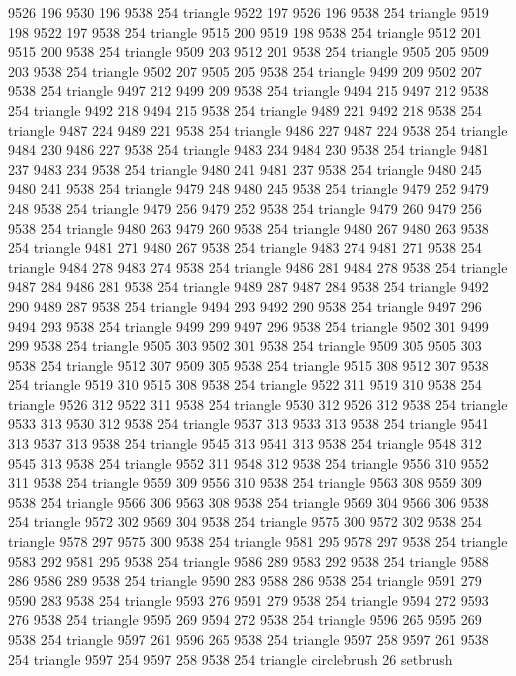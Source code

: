 9526 196 9530 196 9538 254 triangle
9522 197 9526 196 9538 254 triangle
9519 198 9522 197 9538 254 triangle
9515 200 9519 198 9538 254 triangle
9512 201 9515 200 9538 254 triangle
9509 203 9512 201 9538 254 triangle
9505 205 9509 203 9538 254 triangle
9502 207 9505 205 9538 254 triangle
9499 209 9502 207 9538 254 triangle
9497 212 9499 209 9538 254 triangle
9494 215 9497 212 9538 254 triangle
9492 218 9494 215 9538 254 triangle
9489 221 9492 218 9538 254 triangle
9487 224 9489 221 9538 254 triangle
9486 227 9487 224 9538 254 triangle
9484 230 9486 227 9538 254 triangle
9483 234 9484 230 9538 254 triangle
9481 237 9483 234 9538 254 triangle
9480 241 9481 237 9538 254 triangle
9480 245 9480 241 9538 254 triangle
9479 248 9480 245 9538 254 triangle
9479 252 9479 248 9538 254 triangle
9479 256 9479 252 9538 254 triangle
9479 260 9479 256 9538 254 triangle
9480 263 9479 260 9538 254 triangle
9480 267 9480 263 9538 254 triangle
9481 271 9480 267 9538 254 triangle
9483 274 9481 271 9538 254 triangle
9484 278 9483 274 9538 254 triangle
9486 281 9484 278 9538 254 triangle
9487 284 9486 281 9538 254 triangle
9489 287 9487 284 9538 254 triangle
9492 290 9489 287 9538 254 triangle
9494 293 9492 290 9538 254 triangle
9497 296 9494 293 9538 254 triangle
9499 299 9497 296 9538 254 triangle
9502 301 9499 299 9538 254 triangle
9505 303 9502 301 9538 254 triangle
9509 305 9505 303 9538 254 triangle
9512 307 9509 305 9538 254 triangle
9515 308 9512 307 9538 254 triangle
9519 310 9515 308 9538 254 triangle
9522 311 9519 310 9538 254 triangle
9526 312 9522 311 9538 254 triangle
9530 312 9526 312 9538 254 triangle
9533 313 9530 312 9538 254 triangle
9537 313 9533 313 9538 254 triangle
9541 313 9537 313 9538 254 triangle
9545 313 9541 313 9538 254 triangle
9548 312 9545 313 9538 254 triangle
9552 311 9548 312 9538 254 triangle
9556 310 9552 311 9538 254 triangle
9559 309 9556 310 9538 254 triangle
9563 308 9559 309 9538 254 triangle
9566 306 9563 308 9538 254 triangle
9569 304 9566 306 9538 254 triangle
9572 302 9569 304 9538 254 triangle
9575 300 9572 302 9538 254 triangle
9578 297 9575 300 9538 254 triangle
9581 295 9578 297 9538 254 triangle
9583 292 9581 295 9538 254 triangle
9586 289 9583 292 9538 254 triangle
9588 286 9586 289 9538 254 triangle
9590 283 9588 286 9538 254 triangle
9591 279 9590 283 9538 254 triangle
9593 276 9591 279 9538 254 triangle
9594 272 9593 276 9538 254 triangle
9595 269 9594 272 9538 254 triangle
9596 265 9595 269 9538 254 triangle
9597 261 9596 265 9538 254 triangle
9597 258 9597 261 9538 254 triangle
9597 254 9597 258 9538 254 triangle
circlebrush 26 setbrush
